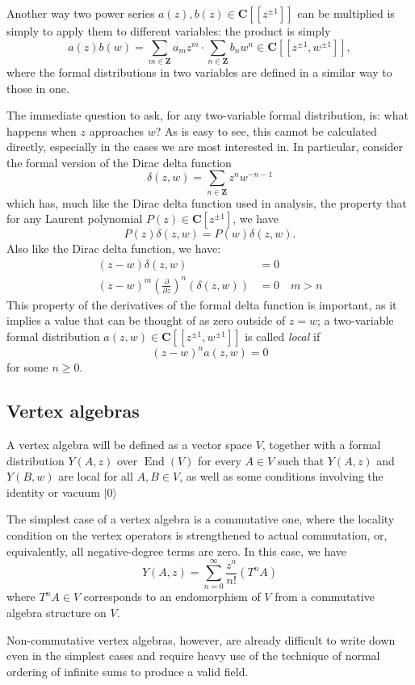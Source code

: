 \documentclass{article}
\newcommand{\CC}{\mathbold{C}}
\newcommand{\ZZ}{\mathbold{Z}}
\newcommand{\vac}{|0\rangle}
\DeclareMathOperator{\End}{End}
\begin{document}
Another way two power series $a(z),b(z) \in \CC[[z^{\pm 1}]]$ can be multiplied is simply to apply them to different variables: the product is simply
\[a(z)b(w)=\sum_{m \in \ZZ}a_mz^m \cdot \sum_{n \in \ZZ}b_nw^n \in \CC[[z^{\pm 1},w^{\pm 1}]], \]
where the formal distributions in two variables are defined in a similar way to those in one.

The immediate question to ask, for any two-variable formal distribution, is: what happens when $z$ approaches $w$?  As is easy to see, this cannot be calculated directly, especially in the cases we are most interested in.  In particular, consider the formal version of the Dirac delta function
\[\delta(z,w)=\sum_{n \in \ZZ} z^n w^{-n-1} \]
which has, much like the Dirac delta function used in analysis, the property that for any Laurent polynomial $P(z) \in \CC[z^{\pm 1}]$, we have
\[P(z) \delta(z,w) = P(w) \delta(z,w). \]
Also like the Dirac delta function, we have:
\begin{align*}
  (z-w) \delta(z,w) &= 0\\
  (z-w)^m \left(\frac{\partial}{\partial z} \right)^n (\delta(z,w))&=0 \quad m>n
\end{align*}
This property of the derivatives of the formal delta function is important, as it implies a value that can be thought of as zero outside of $z=w$; a two-variable formal distribution $a(z,w) \in \CC[[z^{\pm 1},w^{\pm 1}]]$ is called \textit{local} if
\[(z-w)^n a(z,w)=0 \]
for some $n \ge 0$.

\subsection{Vertex algebras}

A vertex algebra will be defined as a vector space $V$, together with a formal distribution $Y(A,z)$ over $\End(V)$ for every $A \in V$ such that $Y(A,z)$ and $Y(B,w)$ are local for all $A,B \in V$, as well as some conditions involving the identity or vacuum $\vac$

The simplest case of a vertex algebra is a commutative one, where the locality condition on the vertex operators is strengthened to actual commutation, or, equivalently, all negative-degree terms are zero.  In this case, we have
\[Y(A,z)=\sum_{n=0}^{\infty} \frac{z^n}{n!}(T^nA) \]
where $T^nA \in V$ corresponds to an endomorphism of $V$ from a commutative algebra structure on $V$.

Non-commutative vertex algebras, however, are already difficult to write down even in the simplest cases and require heavy use of the technique of normal ordering of infinite sums to produce a valid field.
\end{document}
